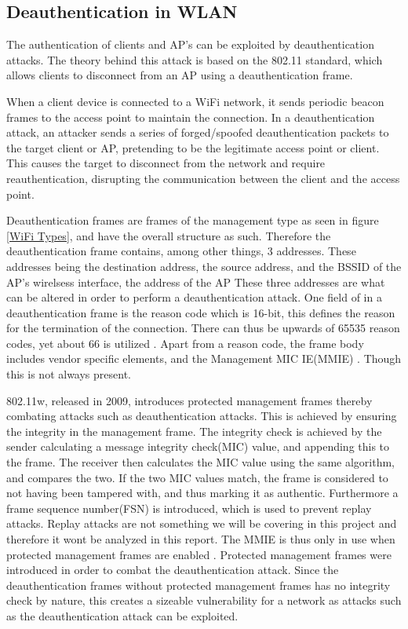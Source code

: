 \subsection{Deauthentication in WLAN}
The authentication of clients and AP's can be exploited by deauthentication attacks. The theory behind this attack is based on the 802.11 standard, which allows clients to disconnect from an AP using a deauthentication frame.

When a client device is connected to a WiFi network, it sends periodic beacon frames to the access point to maintain the connection. In a deauthentication attack, an attacker sends a series of forged/spoofed deauthentication packets to the target client or AP, pretending to be the legitimate access point or client. This causes the target to disconnect from the network and require reauthentication, disrupting the communication between the client and the access point.

Deauthentication frames are frames of the management type as seen in figure \ref{WiFi Types}, and have the overall structure as such. Therefore the deauthentication frame contains, among other things, 3 addresses. These addresses being the destination address, the source address, and the BSSID of the AP's wirelsess interface, the address of the AP  These three addresses are what can be altered in order to perform a deauthentication attack. One field of in a deauthentication frame is the reason code which is 16-bit, this defines the reason for the termination of the connection. There can thus be upwards of 65535 reason codes, yet about 66 is utilized \cite{Cisco_Deathentication_reasoncodes}. Apart from a reason code, the frame body includes vendor specific elements, and the Management MIC IE(MMIE) \cite{IEEE_802.11w}. Though this is not always present. 

802.11w, released in 2009, introduces protected management frames thereby combating attacks such as deauthentication attacks. This is achieved by ensuring the integrity in the management frame. The integrity check is achieved by the sender calculating a message integrity check(MIC) value, and appending this to the frame. The receiver then calculates the MIC value using the same algorithm, and compares the two. If the two MIC values match, the frame is considered to not having been tampered with, and thus marking it as authentic. Furthermore a frame sequence number(FSN) is introduced, which is used to prevent replay attacks. Replay attacks are not something we will be covering in this project and therefore it wont be analyzed in this report. 
The MMIE is thus only in use when protected management frames are enabled \cite{IEEE_802.11w}. Protected management frames were introduced in order to combat the deauthentication attack. Since the deauthentication frames without protected management frames has no integrity check by nature, this creates a sizeable vulnerability for a network as attacks such as the deauthentication attack can be exploited.

